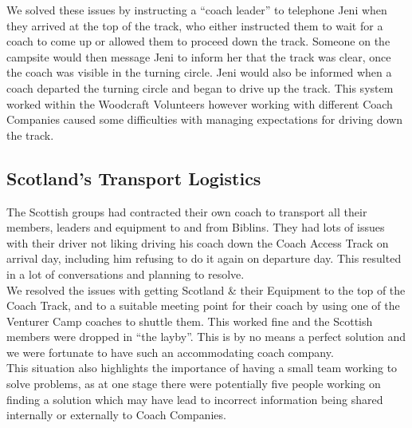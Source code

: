 We solved these issues by instructing a ``coach leader'' to telephone Jeni when they arrived at the top of the track, who either instructed them to wait for a coach to come up or allowed them to proceed down the track. Someone on the campsite would then message Jeni to inform her that the track was clear, once the coach was visible in the turning circle. Jeni would also be informed when a coach departed the turning circle and began to drive up the track. This system worked within the Woodcraft Volunteers however working with different Coach Companies caused some difficulties with managing expectations for driving down the track. 

\subsection{Scotland's Transport Logistics}
The Scottish groups had contracted their own coach to transport all their members, leaders and equipment to and from Biblins. They had lots of issues with their driver not liking driving his coach down the Coach Access Track on arrival day, including him refusing to do it again on departure day. This resulted in a lot of conversations and planning to resolve. \\

We resolved the issues with getting Scotland \& their Equipment to the top of the Coach Track, and to a suitable meeting point for their coach by using one of the Venturer Camp coaches to shuttle them. This worked fine and the Scottish members were dropped in ``the layby''. This is by no means a perfect solution and we were fortunate to have such an accommodating coach company.\\

This situation also highlights the importance of having a small team working to solve problems, as at one stage there were potentially five people working on finding a solution which may have lead to incorrect information being shared internally or externally to Coach Companies. 

